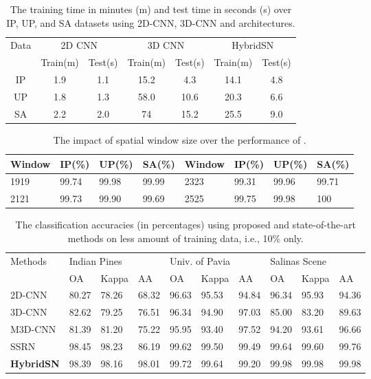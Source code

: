 \documentclass[journal]{IEEEtran}
\begin{document}
\begin{table}[!t]
\caption{The training time in minutes (m) and test time in seconds (s) over IP, UP, and SA datasets using 2D-CNN, 3D-CNN and  architectures.}
\centering
\begin{tabular}{c|c|c|c|c|c|c}
\toprule
\multirow{2}{*}{Data} & \multicolumn{2}{c|}{2D CNN}
& \multicolumn{2}{c|}{3D CNN}
& \multicolumn{2}{c}{HybridSN} \\ 
\cline{2-7} 
& Train(m) & Test(s) & Train(m) & Test(s) & Train(m) & Test(s) \\ 
\hline
IP & 1.9 & 1.1 & 15.2 & 4.3 & 14.1 & 4.8 \\
UP & 1.8 & 1.3 & 58.0 & 10.6 & 20.3 & 6.6 \\
SA & 2.2 & 2.0 & 74 & 15.2 & 25.5 & 9.0 \\ 
\bottomrule
\end{tabular}
\label{tab:time}
\end{table}

\begin{table}[!t]
\centering
\caption{The impact of spatial window size over the performance of .}
\begin{tabular}{m{0.7cm}m{0.65cm}m{0.65cm}m{0.65cm}|m{0.7cm}m{0.65cm}m{0.65cm}m{0.65cm}}
\toprule
Window & IP(\%) & UP(\%) & SA(\%) & Window & IP(\%) & UP(\%) & SA(\%)\\
\midrule
1919 & 99.74 & 99.98 & 99.99 & 2323 & 99.31 & 99.96 & 99.71\\
2121 & 99.73 & 99.90 & 99.69 & 2525 & 99.75 & 99.98 & 100\\ 
\bottomrule
\end{tabular}
\label{tab:spatial}
\end{table}


\begin{table}[!t]
\caption{The classification accuracies (in percentages) using proposed and state-of-the-art methods on less amount of training data, i.e., 10\% only.}
\centering
\begin{tabular}{m{1.29cm}|m{0.3cm}m{0.4cm}m{0.4cm}|m{0.3cm}m{0.4cm}m{0.4cm}|m{0.3cm}m{0.4cm}m{0.4cm}}
\toprule
\multirow{2}{*}{Methods} & \multicolumn{3}{m{1.5cm}|}{Indian Pines} & \multicolumn{3}{m{1.7cm}|}{Univ. of Pavia} & \multicolumn{3}{m{1.6cm}}{Salinas Scene}\\
\cline{2-10}
 & OA & Kappa & AA & OA & Kappa & AA & OA & Kappa & AA\\
\midrule
2D-CNN & 80.27 & 78.26 & 68.32 & 96.63 & 95.53 & 94.84 & 96.34 & 95.93 & 94.36\\
3D-CNN & 82.62 & 79.25 & 76.51 & 96.34 & 94.90 & 97.03 & 85.00 & 83.20 & 89.63\\
M3D-CNN & 81.39 & 81.20 & 75.22 & 95.95 & 93.40 & 97.52 & 94.20 & 93.61 & 96.66\\
SSRN & 98.45 & 98.23 & 86.19 & 99.62 & 99.50 & 99.49 & 99.64 & 99.60 & 99.76\\
\textbf{HybridSN} & 98.39 & 98.16 & 98.01 & 99.72 & 99.64 & 99.20 & 99.98 & 99.98 & 99.98\\
\bottomrule
\end{tabular}
\label{tab:lesstraining}
\end{table}
\end{document}
